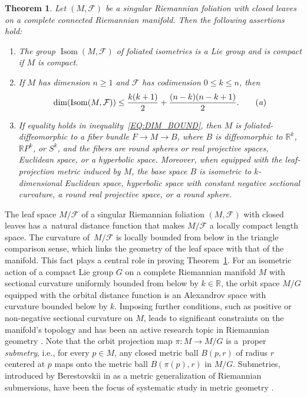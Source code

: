 \documentclass[10pt,a4paper]{amsart}
\numberwithin{equation}{section}
\newtheorem{theoremalpha}{Theorem}
\theoremstyle{definition}
\DeclareMathOperator{\Iso}{Isom}
\newcommand{\R}{\mathbb{R}} %
\newcommand{\RP}{\mathbb{R}P} %
\newcommand{\fol}{\mathcal{F}}
\begin{document}
\begin{theoremalpha}\label{T:MAIN_THM_SRF}
		Let $(M,\fol)$ be a singular Riemannian foliation with closed leaves on a complete connected Riemannian manifold. Then the following assertions hold:
		\begin{enumerate}[label=$(\roman*)$]\itemsep=0pt
			\item\label{C:MAIN_THM_i} The group $\Iso(M,\fol)$ of foliated isometries is a Lie group and is compact if $M$ is compact.
			\item\label{C:MAIN_THM_ii} If $M$ has dimension $n\geq 1$ and $\fol$ has codimension $0\leq k\leq n$, then
				\begin{equation}
				\dim(\Iso(M,\fol))\leq\frac{k(k+1)}{2} + \frac{(n-k)(n-k+1)}{2}.\tag{\emph{a}}\label{EQ:DIM_BOUND}		
				\end{equation}
			\item\label{C:MAIN_THM_iii} If equality holds in inequality~\eqref{EQ:DIM_BOUND}, then $M$ is foliated-diffeomorphic to a fiber bundle $F\to M\to B$, where $B$ is diffeomorphic to $\R^k$, $\RP^k$, or $S^k$, and the fibers are round spheres or real projective spaces, Euclidean space, or a hyperbolic space. Moreover, when equipped with the leaf-projection metric induced by $M$, the base space $B$ is isometric to $k$-dimensional Euclidean space, hyperbolic space with constant negative sectional curvature, a round real projective space, or a round sphere. 	
		\end{enumerate}
	\end{theoremalpha}


The leaf space $M/\fol$ of a singular Riemannian foliation $(M,\fol)$ with closed leaves has a~natural distance function that makes $M/\fol$ a locally compact length space. The curvature of~$M/\fol$ is locally bounded from below in the triangle comparison sense, which links the geometry of the leaf space with that of the manifold. This fact plays a central role in proving Theorem~\ref{T:MAIN_THM_SRF}.
For an isometric action of a compact Lie group $G$ on a complete Riemannian manifold $M$ with sectional curvature uniformly bounded from below by $k\in \R$, the orbit space $M/G$ equipped with the orbital distance function is an Alexandrov space with curvature bounded below by $k$. Imposing further conditions, such as positive or non-negative sectional curvature on $M$, leads to significant constraints on the manifold's topology and has been an active research topic in Riemannian geometry \cite{Grove2002,Grove2017,Wilking2007}.
Note that the orbit projection map $\pi\colon M\to M/G$ is a~proper \emph{submetry}, i.e., for every $p\in M$, any closed metric ball $B(p,r)$ of radius $r$ centered at $p$ maps onto the metric ball $B(\pi(p),r)$ in $M/G$. Submetries, introduced by Berestovskii in \cite{Berestovskii1987} as a metric generalization of Riemannian submersions, have been the focus of systematic study in metric geometry \cite{BeretovskiiGuijarro2000,GuijarroWalschap2011,KapovitchLytchak2022,Lytchak,Lytchak2024,LytchakWilking2024}.
\end{document}
